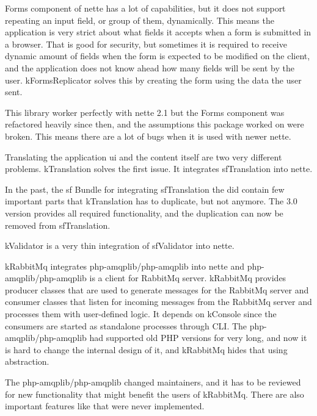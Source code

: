 Forms component of \gls{nette} has a lot of capabilities, but it does not support repeating an input field, or group of them, dynamically. This means the application is very strict about what fields it accepts when a form is submitted in a browser. That is good for security, but sometimes it is required to receive dynamic amount of fields when the form is expected to be modified on the client, and the application does not know ahead how many fields will be sent by the user. \gls{kFormsReplicator} solves this by creating the form using the data the user sent.

This library worker perfectly with \gls{nette} 2.1 but the Forms component was refactored heavily since then, and the assumptions this package worked on were broken. This means there are a lot of bugs when it is used with newer \gls{nette}.

 \label{sec:state:translation}

Translating the application \gls{ui} and the content itself are two very different problems. \gls{kTranslation} solves the first issue. It integrates \gls{sfTranslation} into \gls{nette}.

In the past, the \gls{sf} Bundle for integrating \gls{sfTranslation} the did contain few important parts that \gls{kTranslation} has to duplicate, but not anymore. The 3.0 version provides all required functionality, and the duplication can now be removed from \gls{sfTranslation}.

 \label{sec:state:validator}

\gls{kValidator} is a very thin integration of \gls{sfValidator} into \gls{nette}.

 \label{sec:state:rabbit-mq}

\gls{kRabbitMq} integrates php-amqplib/php-amqplib into \gls{nette} and php-amqplib/php-amqplib is a client for RabbitMq server. \gls{kRabbitMq} provides producer classes that are used to generate messages for the RabbitMq server and consumer classes that listen for incoming messages from the RabbitMq server and processes them with user-defined logic. It depends on \gls{kConsole} since the consumers are started as standalone processes through CLI. The php-amqplib/php-amqplib had supported old PHP versions for very long, and now it is hard to change the internal design of it, and \gls{kRabbitMq} hides that using abstraction.

The php-amqplib/php-amqplib changed maintainers, and it has to be reviewed for new functionality that might benefit the users of \gls{kRabbitMq}. There are also important features like  that were never implemented.

